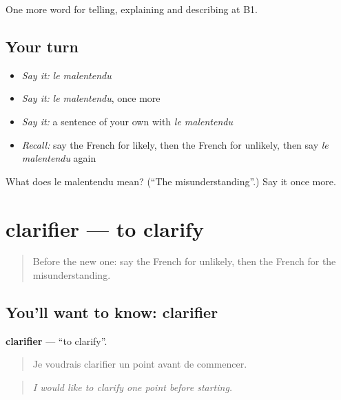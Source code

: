 \begin{grammarlens}[title={What you've built}]
One more word for telling, explaining and describing at B1.
\end{grammarlens}

\subsection*{Your turn}
\begin{itemize}
\raggedright
  \item \emph{Say it:} \emph{le malentendu}
  \item \emph{Say it:} \emph{le malentendu}, once more
  \item \emph{Say it:} a sentence of your own with \emph{le malentendu}
  \item \emph{Recall:} say the French for likely, then the French for unlikely, then say \emph{le malentendu} again
\end{itemize}

\begin{tcolorbox}[breakable,colback=teal!4,colframe=teal!35!black,title={Before you move on}]
What does le malentendu mean? (\textquotedblleft{}The misunderstanding\textquotedblright{}.) Say it once more.
\end{tcolorbox}
\section[clarifier]{clarifier — to clarify}

\label{lesson:FR-C341-clarifier}



\begin{quote}
Before the new one: say the French for unlikely, then the French for the misunderstanding.
\end{quote}

\subsection*{You'll want to know: clarifier}
\textbf{clarifier} — \textquotedblleft{}to clarify\textquotedblright{}.

\begin{quote}
Je voudrais clarifier un point avant de commencer.
\end{quote}

\begin{quote}
\emph{I would like to clarify one point before starting.}
\end{quote}

